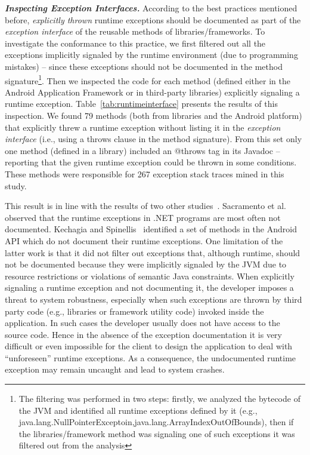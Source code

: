 \emph{\textbf{Inspecting Exception Interfaces.}}  According to the best practices mentioned before,
 \emph{explicitly thrown} runtime exceptions
should be documented as part of the \emph{exception interface} of the reusable
methods of libraries/frameworks. To investigate the conformance to this practice, we first filtered out all the exceptions implicitly
 signaled by  the runtime environment (due to programming mistakes) -- since these exceptions
should not be documented in the method signature\footnote{The filtering was performed in two steps:
firstly, we analyzed the bytecode of the JVM and identified all runtime exceptions defined by it (e.g.,
java.lang.NullPointerExceptoin,java.lang.ArrayIndexOutOfBounds), then
if the libraries/framework method was signaling one of such exceptions it was filtered out from the analysis}.
 Then we inspected
the code for each method
(defined either in the Android  Application Framework or in third-party libraries)
explicitly signaling a runtime exception.
Table~\ref{tab:runtimeinterface} presents the results of this inspection.
We found 79 methods (both from libraries and the Android platform) that  explicitly threw a runtime exception
without listing it in the \emph{exception interface} (i.e., using
a throws clause in the method signature). From this set only one method (defined in a library)
included an @throws tag in its Javadoc -- reporting that the given runtime exception
could be thrown in some conditions. These methods were responsible for
267 exception stack traces mined in this study.

This result is in line with the results of two other studies~\cite{sacramento2006unchecked,kechagia2014}.
Sacramento et al.~\cite{sacramento2006unchecked} observed that the
runtime exceptions in .NET programs are most often not documented.
Kechagia and Spinellis~\cite{kechagia2014} identified a set of methods
in the Android API which do not document their runtime exceptions. One limitation
of the latter work is that it did not filter out exceptions that,
although runtime, should not be documented because they were implicitly signaled by the
JVM due to resource restrictions or violations of semantic Java constraints.
When explicitly signaling a runtime exception and not documenting it,
the developer imposes a threat to system robustness, especially
when such exceptions are thrown by third party code (e.g., libraries or framework utility code)
 invoked inside the application. In such cases the developer usually does not have access to
the source code. Hence in the absence of the exception documentation it is very difficult or even impossible
 for the client to design the application to deal with ``unforeseen'' runtime exceptions. As a consequence, the
 undocumented runtime exception may remain uncaught and lead to system crashes.

